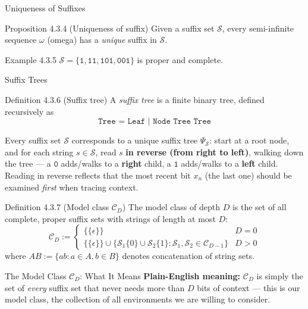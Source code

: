 \documentclass[aspectratio=169,10pt]{beamer}
\begin{document}
\begin{frame}{Uniqueness of Suffixes}
\begin{block}{Proposition 4.3.4 (Uniqueness of suffix)}
Given a suffix set $\mathcal S$, every semi-infinite sequence $\omega$ (omega) has a
\emph{unique} suffix in $\mathcal S$.
\end{block}

\begin{exampleblock}{Example 4.3.5}
$\mathcal S=\{\mathtt1,\mathtt{11},\mathtt{101},\mathtt{001}\}$ is proper and complete.
\end{exampleblock}
\end{frame}

\begin{frame}{Suffix Trees}
\begin{block}{Definition 4.3.6 (Suffix tree)}
A \emph{suffix tree} is a finite binary tree, defined recursively as
$$
\texttt{Tree = Leaf | Node Tree Tree}
$$
\end{block}
Every suffix set $\mathcal S$ corresponds to a unique suffix tree $\Psi_{\mathcal S}$: start
at a root node, and for each string $s\in\mathcal S$, read $s$ \textbf{in reverse (from
right to left)}, walking down the tree — a $\mathtt 0$ adds/walks to a \textbf{right} child,
a $\mathtt 1$ adds/walks to a \textbf{left} child. Reading in reverse reflects that the most
recent bit $x_n$ (the last one) should be examined \emph{first} when tracing context.

\begin{block}{Definition 4.3.7 (Model class $\mathcal{C}_D$)}
The model class of depth $D$ is the set of all complete, proper suffix sets with strings of
length at most $D$:
$$
\mathcal{C}_D := \begin{cases}
\{\{\epsilon\}\} & D=0\\
\{\{\epsilon\}\}\cup\{\mathcal S_1\{0\}\cup\mathcal S_2\{1\}:\mathcal S_1,\mathcal S_2\in\mathcal C_{D-1}\} & D>0
\end{cases}
$$
where $AB:=\{ab:a\in A,b\in B\}$ denotes concatenation of string sets.
\end{block}
\end{frame}

\begin{frame}{The Model Class $\mathcal C_D$: What It Means}
\textbf{Plain-English meaning:} $\mathcal C_D$ is simply the set of \emph{every} suffix set
that never needs more than $D$ bits of context — this is our model class, the collection of
all environments we are willing to consider.
\end{frame}
\end{document}
